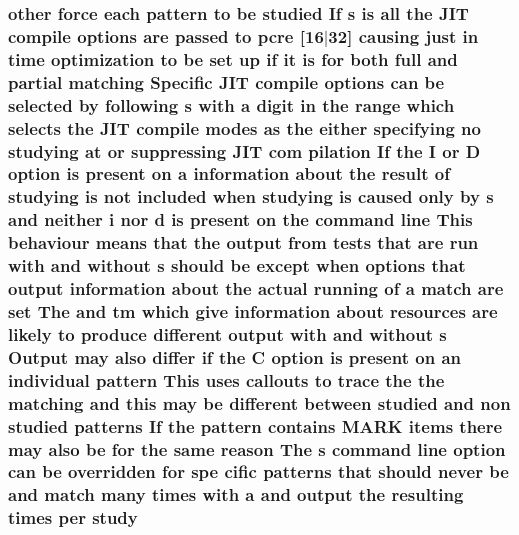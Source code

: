 \subsubsection[{\texorpdfstring{study}{study}}]{ other force each {\bf pattern} {\bf to} {\bf be} {\bf studied} If {\bf s} {\bf is} {\bf all} the J\+IT {\bf compile} {\bf options} {\bf are} passed {\bf to} {\bf pcre} \mbox{[}16$\vert$32\mbox{]} causing just {\bf in} {\bf time} optimization {\bf to} {\bf be} {\bf set} up {\bf if} {\bf it} {\bf is} for both full and {\bf partial} {\bf matching} Specific J\+IT {\bf compile} {\bf options} {\bf can} {\bf be} {\bf selected} by following {\bf s} {\bf with} {\bf a} digit {\bf in} the range {\bf which} selects the J\+IT {\bf compile} {\bf modes} {\bf as} the either {\bf specifying} no {\bf studying} at {\bf or} suppressing J\+IT com pilation If the {\bf I} {\bf or} {\bf D} {\bf option} {\bf is} {\bf present} {\bf on} {\bf a} information about the {\bf result} {\bf of} {\bf studying} {\bf is} {\bf not} {\bf included} when {\bf studying} {\bf is} caused only by {\bf s} and neither {\bf i} nor {\bf d} {\bf is} {\bf present} {\bf on} the {\bf command} {\bf line} This behaviour means that the {\bf output} {\bf from} {\bf tests} that {\bf are} {\bf run} {\bf with} and without {\bf s} should {\bf be} {\bf except} when {\bf options} that {\bf output} information about the actual running {\bf of} {\bf a} {\bf match} {\bf are} {\bf set} The and {\bf tm} {\bf which} give information about resources {\bf are} likely {\bf to} produce different {\bf output} {\bf with} and without {\bf s} Output may also differ {\bf if} the {\bf C} {\bf option} {\bf is} {\bf present} {\bf on} an individual {\bf pattern} This uses callouts {\bf to} trace the the {\bf matching} and {\bf this} may {\bf be} different between {\bf studied} and non {\bf studied} {\bf patterns} If the {\bf pattern} {\bf contains} M\+A\+RK items there may also {\bf be} for the same {\bf reason} The {\bf s} {\bf command} {\bf line} {\bf option} {\bf can} {\bf be} overridden for spe cific {\bf patterns} that should never {\bf be} and {\bf match} many {\bf times} {\bf with} {\bf a} and {\bf output} the resulting {\bf times} per study}\hypertarget{pcretest_8txt_ad3e0d03c4531f529451b54c48ee48bb6}{}\label{pcretest_8txt_ad3e0d03c4531f529451b54c48ee48bb6}
